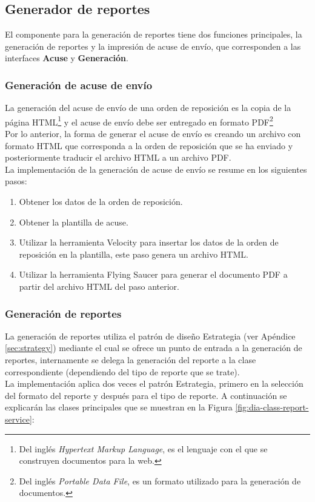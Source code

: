 \subsection{Generador de reportes}
El componente para la generación de reportes tiene dos funciones principales, la generación de reportes y la impresión de acuse de envío, que corresponden a las interfaces \textbf{Acuse} y \textbf{Generación}.

\subsubsection{Generación de acuse de envío}\label{sec:gen-acuse}
La generación del acuse de envío de una orden de reposición es la copia de la página HTML\footnote{Del inglés \textit{Hypertext Markup Language}, es el lenguaje con el que se construyen documentos para la web\cite{HTMLCSSCompleteReference}.} y el acuse de envío debe ser entregado en formato PDF\footnote{Del inglés \textit{Portable Data File}, es un formato utilizado para la generación de documentos\cite{iTextInAction}.}\\
Por lo anterior, la forma de generar el acuse de envío es creando un archivo con formato HTML que corresponda a la orden de reposición que se ha enviado y posteriormente traducir el archivo HTML a un archivo PDF.\\
La implementación de la generación de acuse de envío se resume en los siguientes pasos:
\begin{enumerate}
	\item Obtener los datos de la orden de reposición.
	\item Obtener la plantilla de acuse.
	\item Utilizar la herramienta Velocity para insertar los datos de la orden de reposición en la plantilla, este paso genera un archivo HTML.
	\item Utilizar la herramienta Flying Saucer para generar el documento PDF a partir del archivo HTML del paso anterior.
\end{enumerate}

\subsubsection{Generación de reportes}\label{sec:gen-repport}
La generación de reportes utiliza el patrón de diseño Estrategia (ver Apéndice \ref{sec:strategy}) mediante el cual se ofrece un punto de entrada a la generación de reportes, internamente se delega la generación del reporte a la clase correspondiente (dependiendo del tipo de reporte que se trate).\\
La implementación aplica dos veces el patrón Estrategia, primero en la selección del formato del reporte y después para el tipo de reporte. A continuación se explicarán las clases principales que se muestran en la Figura \ref{fig:dia-class-report-service}:

